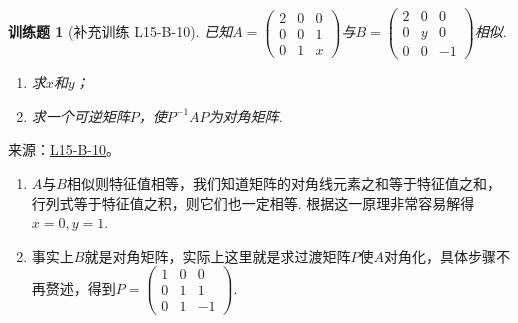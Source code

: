 \documentclass[UTF8,12pt,a4paper,fontset=fandol]{ctexart}
\newtheorem{exercise}{训练题}[section]
\begin{document}
\begin{exercise}[补充训练 L15-B-10]\label{prob:L15-B-10}
已知$A=\begin{pmatrix}
                2 & 0 & 0 \\ 0 & 0 & 1 \\ 0 & 1 & x
            \end{pmatrix}$与$B=\begin{pmatrix}
                2 & 0 & 0 \\ 0 & y & 0 \\ 0 & 0 & -1
            \end{pmatrix}$相似.
        \begin{enumerate}
            \item 求$x$和$y$；

            \item 求一个可逆矩阵$P$，使$P^{-1}AP$为对角矩阵.
        \end{enumerate}
\end{exercise}
\noindent 来源：\href{https://github.com/yhwu-is/Linear-Algebra-Left-Undone/blob/new/%E8%AE%B2%E4%B9%89/%E4%B8%93%E9%A2%98/15%20%E7%9B%B8%E4%BC%BC%E6%A0%87%E5%87%86%E5%BD%A2%EF%BC%9A%E5%A4%8D%E6%95%B0%E5%9F%9F%E4%B8%8A%E7%9A%84%E5%B0%9D%E8%AF%95%E4%B8%8E%E7%90%86%E8%AE%BA.tex}{L15-B-10}。
\begin{solve}
\begin{enumerate}
                \item $A$与$B$相似则特征值相等，我们知道矩阵的对角线元素之和等于特征值之和，行列式等于特征值之积，则它们也一定相等. 根据这一原理非常容易解得$x=0,y=1$.

                \item 事实上$B$就是对角矩阵，实际上这里就是求过渡矩阵$P$使$A$对角化，具体步骤不再赘述，得到$P=\begin{pmatrix}
                              1 & 0 & 0 \\ 0 & 1 & 1 \\ 0 & 1 & -1
                          \end{pmatrix}$.
            \end{enumerate}
\end{solve}
\end{document}
